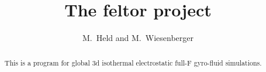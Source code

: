 





\title{The feltor project}
\author{ M.~Held and M.~Wiesenberger}
\maketitle

\begin{abstract}
This is a program for global 3d isothermal electrostatic full-F gyro-fluid simulations.
\end{abstract}

